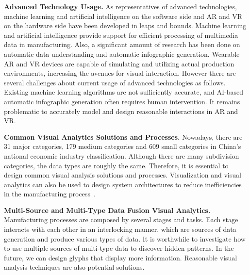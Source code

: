 \documentclass[a4paper,fleqn]{cas-dc}
\begin{document}
\textbf{Advanced Technology Usage.}
As representatives of advanced technologies, machine learning and artificial intelligence on the software side and AR and VR on the hardware side have been developed in leaps and bounds.
Machine learning and artificial intelligence provide support for efficient processing of multimedia data in manufacturing. Also, a significant amount of research has been done on automatic data understanding and automatic infographic generation.
Wearable AR and VR devices are capable of simulating and utilizing actual production environments, increasing the avenues for visual interaction.
However there are several challenges about current usage of advanced technologies as follows. Existing machine learning algorithms are not sufficiently accurate, and AI-based automatic infographic generation often requires human intervention. It remains problematic to accurately model and design reasonable interactions in AR and VR. 

\textbf{Common Visual Analytics Solutions and Processes.}
Nowadays, there are 31 major categories, 179 medium categories and 609 small categories in China's national economic industry classification. Although there are many subdivision categories, the data types are roughly the same.
Therefore, it is essential to design common visual analysis solutions and processes.
Visualization and visual analytics can also be used to design system architectures to reduce inefficiencies in the manufacturing process~\cite{Marconi2021,Yao2019}.

\textbf{Multi-Source and Multi-Type Data Fusion Visual Analytics.}
Manufacturing processes are composed by several stages and tasks. Each stage interacts with each other in an interlocking manner, which are sources of data generation and produce various types of data.
It is worthwhile to investigate how to use multiple sources of multi-type data to discover hidden patterns.
In the future, we can design glyphs that display more information. Reasonable visual analysis techniques are also potential solutions.


%

\end{document}
